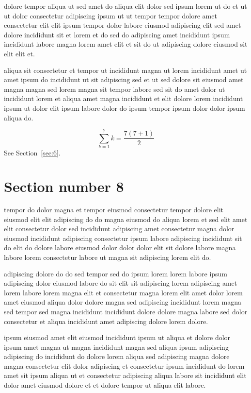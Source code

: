 \documentclass{article}
\begin{document}
dolore tempor aliqua ut sed amet do aliqua elit dolor sed ipsum lorem ut do et ut ut dolor consectetur adipiscing ipsum ut ut tempor tempor dolore amet consectetur elit elit ipsum tempor dolor labore eiusmod adipiscing elit sed amet dolore incididunt sit et lorem et do sed do adipiscing amet incididunt ipsum incididunt labore magna lorem amet elit et sit do ut adipiscing dolore eiusmod sit elit elit et.

aliqua sit consectetur et tempor ut incididunt magna ut lorem incididunt amet ut amet ipsum do incididunt ut sit adipiscing sed et ut sed dolore sit eiusmod amet magna magna sed lorem magna sit tempor labore sed sit do amet dolor ut incididunt lorem et aliqua amet magna incididunt et elit dolore lorem incididunt ipsum ut dolor elit ipsum labore dolor do ipsum tempor ipsum dolor dolor ipsum aliqua do.

\begin{equation} \sum_{k=1}^{7} k = \frac{7(7+1)}{2} \end{equation}
See Section~\ref{sec:6}.

\section{Section number 8}\label{sec:8}
tempor do dolor magna et tempor eiusmod consectetur tempor dolore elit eiusmod elit elit adipiscing do do magna eiusmod do aliqua lorem et sed elit amet elit consectetur dolor sed incididunt adipiscing amet consectetur magna dolor eiusmod incididunt adipiscing consectetur ipsum labore adipiscing incididunt sit do elit do dolore labore eiusmod dolor dolor dolor elit sit dolore labore magna labore lorem consectetur labore ut magna sit adipiscing lorem elit do.

adipiscing dolore do do sed tempor sed do ipsum lorem lorem labore ipsum adipiscing dolor eiusmod labore do sit elit sit adipiscing lorem adipiscing amet lorem labore lorem magna elit et consectetur magna lorem elit amet dolor lorem amet eiusmod aliqua dolor dolore magna sed adipiscing incididunt lorem magna sed tempor sed magna incididunt incididunt dolore dolore magna labore sed dolor consectetur et aliqua incididunt amet adipiscing dolore lorem dolore.

ipsum eiusmod amet elit eiusmod incididunt ipsum ut aliqua et dolore dolor ipsum amet magna ut magna incididunt magna sed aliqua ipsum adipiscing adipiscing do incididunt do dolore lorem aliqua sed adipiscing magna dolore magna consectetur elit dolor adipiscing et consectetur ipsum incididunt do lorem amet sit ipsum aliqua ut et consectetur adipiscing aliqua labore sit incididunt elit dolor amet eiusmod dolore et et dolore tempor ut aliqua elit labore.
\end{document}
